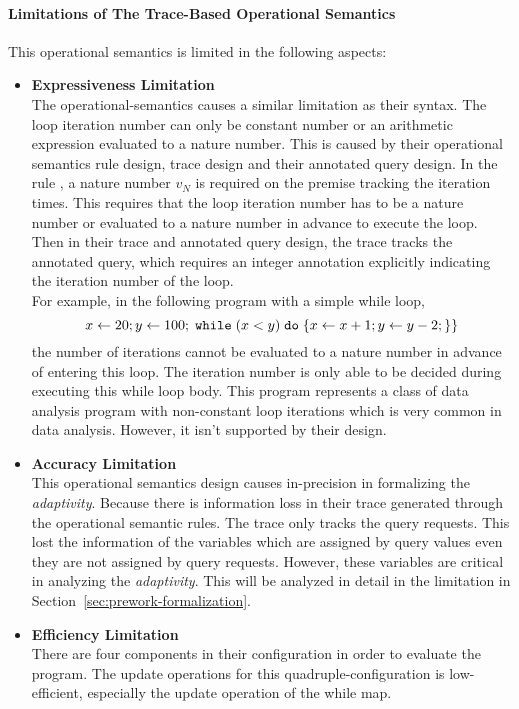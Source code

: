 \paragraph*{Limitations of The Trace-Based Operational Semantics}
This operational semantics is limited in the following aspects:
\begin{itemize}
  \item \textbf{Expressiveness Limitation}
  \\
  The operational-semantics causes a similar limitation as their syntax.
  The loop iteration number can only be constant number or an arithmetic expression evaluated to a nature number.
  This is caused by their operational semantics rule design, trace design and their annotated query design.
  In the rule , a nature number $v_N$ is required on the premise tracking the iteration times.
  This requires that the loop iteration number has to be a nature number or evaluated to a nature number in advance to execute the loop.
  Then in their trace and annotated query design,
  the trace tracks the annotated query, which requires an integer annotation explicitly indicating the iteration number of the loop.
  \\
  For example, in the following program with a simple while loop,
  \[
    {\mathrel{ x \leftarrow 20 }};
    \mathrel{ y \leftarrow 100 };
    \;\mathtt{while}\; (x < y) \;\mathtt{do}\; 
    \{
      \mathrel{ x \leftarrow x + 1 };
      \mathrel{ y \leftarrow y - 2 };
      \}\}
    \] 
  the number of iterations cannot be evaluated to a nature number in advance of entering this loop. 
    The iteration number is only
  able to be decided during executing this while loop body.
  This program represents a class of data analysis program with non-constant loop iterations
  which is very common in data analysis. However, it isn't supported by their design.
  \item \textbf{Accuracy Limitation}
  \\
  This operational semantics design causes in-precision in formalizing the \emph{adaptivity}.
  Because there is information loss in their trace generated through the operational semantic rules.
  The trace only tracks the query requests. This lost the information of the variables
    which are assigned by query values even they are not assigned by query requests. However, these variables
    are critical in analyzing the \emph{adaptivity}.
    This will be analyzed in detail in the limitation in Section~\ref{sec:prework-formalization}.
  \item \textbf{Efficiency Limitation}
  \\
  There are four components in their configuration in order to evaluate the program. 
    The update operations for this quadruple-configuration is low-efficient, especially the update operation of the while map.
\end{itemize}